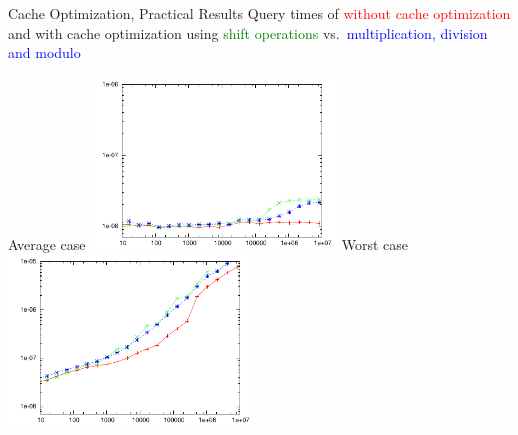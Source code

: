 \documentclass{beamer}
\begin{document}
\begin{frame}{Cache Optimization, Practical Results}
    Query times of \fprint[3]
    \textcolor{red}{without cache optimization}
    and with cache optimization using
    \textcolor{green}{shift operations} vs.\
    \textcolor{blue}{multiplication, division and modulo}
    \begin{multicols}{2}{
        \begin{center}
            Average case
            \includegraphics[width=0.49\textwidth,type=pdf,ext=.pdf,read=.pdf]{../src/results/length-slides-cache-fp3-rand10.plt}
            \newpage
            Worst case
            \includegraphics[width=0.49\textwidth,type=pdf,ext=.pdf,read=.pdf]{../src/results/length-slides-cache-fp3-alla.plt}
        \end{center}
    }
    \end{multicols}
\end{frame}
\end{document}
